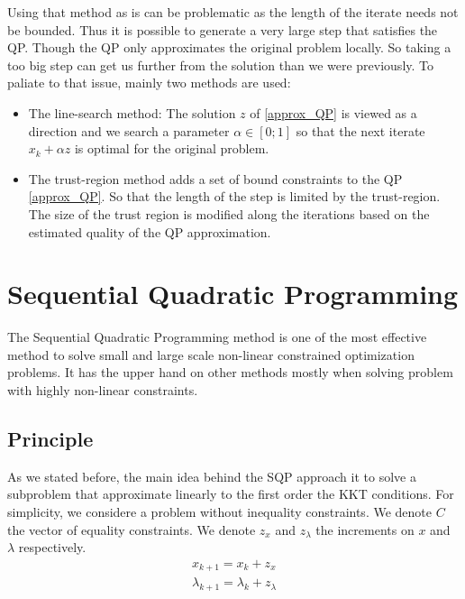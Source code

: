 Using that method as is can be problematic as the length of the iterate needs not be bounded.
Thus it is possible to generate a very large step that satisfies the QP.
Though the QP only approximates the original problem locally.
So taking a too big step can get us further from the solution than we were previously.
To paliate to that issue, mainly two methods are used:
\begin{itemize}
  \item The line-search method: The solution $z$ of \ref{approx_QP} is viewed as a direction and we search a parameter $\alpha\in [0;1]$ so that the next iterate $x_k + \alpha z$ is optimal for the original problem.
  \item The trust-region method adds a set of bound constraints to the QP \ref{approx_QP}. So that the length of the step is limited by the trust-region. The size of the trust region is modified along the iterations based on the estimated quality of the QP approximation.
\end{itemize}

\section{Sequential Quadratic Programming}
\label{sec:sequential_quadratic_programming}

The Sequential Quadratic Programming method is one of the most effective method to solve small and large scale non-linear constrained optimization problems.
It has the upper hand on other methods mostly when solving problem with highly non-linear constraints.

\subsection{Principle}
\label{sub:principle}

As we stated before, the main idea behind the SQP approach it to solve a subproblem that approximate linearly to the first order the KKT conditions.
For simplicity, we considere a problem without inequality constraints.
We denote $C$ the vector of equality constraints.
We denote $z_x$ and $z_\lambda$ the increments on $x$ and $\lambda$ respectively.
\begin{equation}
  \begin{array}{l}
    x_{k+1} = x_k + z_x\\
    \lambda_{k+1} = \lambda_k+z_\lambda\\
  \end{array}
\end{equation}

